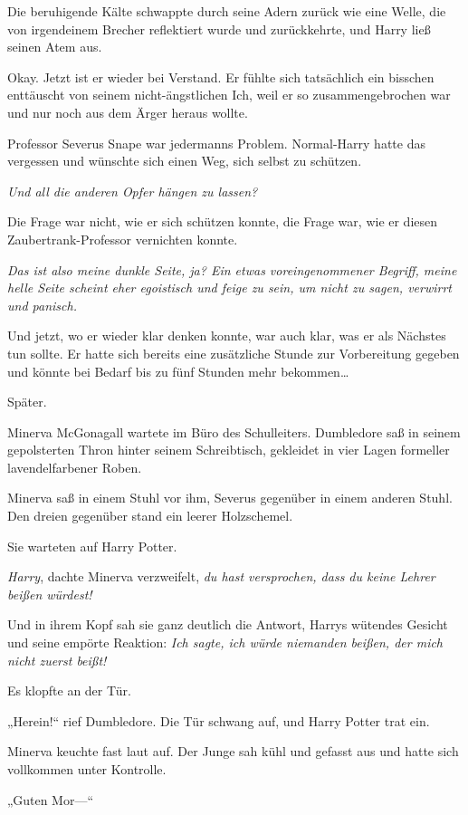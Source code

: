 {Die beruhigende Kälte schwappte durch seine Adern zurück wie eine Welle, die von irgendeinem Brecher reflektiert wurde und zurückkehrte, und Harry ließ seinen Atem aus.

Okay. Jetzt ist er wieder bei Verstand. Er fühlte sich tatsächlich ein bisschen enttäuscht von seinem nicht-ängstlichen Ich, weil er so zusammengebrochen war und nur noch aus dem Ärger heraus wollte.

Professor Severus Snape war jedermanns Problem. Normal-Harry hatte das vergessen und wünschte sich einen Weg, sich selbst zu schützen.

\emph{Und all die anderen Opfer hängen zu lassen?}

Die Frage war nicht, wie er sich schützen konnte, die Frage war, wie er diesen Zaubertrank-Professor vernichten konnte.

\emph{Das ist also meine dunkle Seite, ja? Ein etwas voreingenommener Begriff, meine helle Seite scheint eher egoistisch und feige zu sein, um nicht zu sagen, verwirrt und panisch.}

Und jetzt, wo er wieder klar denken konnte, war auch klar, was er als Nächstes tun sollte. Er hatte sich bereits eine zusätzliche Stunde zur Vorbereitung gegeben und könnte bei Bedarf bis zu fünf Stunden mehr bekommen…

Später.

Minerva McGonagall wartete im Büro des Schulleiters. Dumbledore saß in seinem gepolsterten Thron hinter seinem Schreibtisch, gekleidet in vier Lagen formeller lavendelfarbener Roben.

Minerva saß in einem Stuhl vor ihm, Severus gegenüber in einem anderen Stuhl. Den dreien gegenüber stand ein leerer Holzschemel.

Sie warteten auf Harry Potter.

\emph{Harry}, dachte Minerva verzweifelt, \emph{du hast versprochen, dass du keine Lehrer beißen würdest!}

Und in ihrem Kopf sah sie ganz deutlich die Antwort, Harrys wütendes Gesicht und seine empörte Reaktion: \emph{Ich sagte, ich würde niemanden beißen, der mich nicht zuerst beißt!}

Es klopfte an der Tür.

„Herein!“ rief Dumbledore. Die Tür schwang auf, und Harry Potter trat ein.

Minerva keuchte fast laut auf. Der Junge sah kühl und gefasst aus und hatte sich vollkommen unter Kontrolle.

„Guten Mor—“

}
